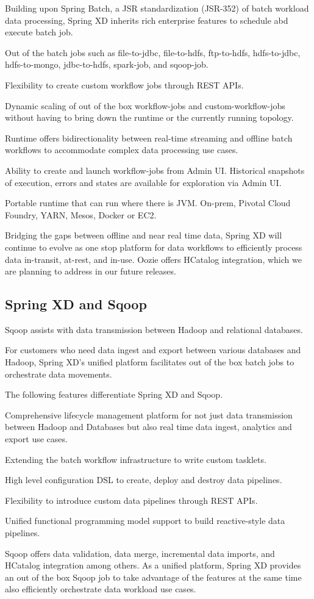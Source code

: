 \begin{itemize*}
\item Building upon Spring Batch, a JSR standardization (JSR-352) of batch workload data processing, Spring XD inherits rich enterprise features to schedule abd execute batch job.
\item Out of the batch jobs such as file-to-jdbc, file-to-hdfs, ftp-to-hdfs, hdfs-to-jdbc, hdfs-to-mongo, jdbc-to-hdfs, spark-job, and sqoop-job.
\item Flexibility to create custom workflow jobs through REST APIs.
\item Dynamic scaling of out of the box workflow-jobs and custom-workflow-jobs without having to bring down the runtime or the currently running topology.
\item Runtime offers bidirectionality between real-time streaming and offline batch workflows to accommodate complex data processing use cases.
\item Ability to create and launch workflow-jobs from Admin UI. Historical snapshots of execution, errors and states are available for exploration via Admin UI.
\item Portable runtime that can run where there is JVM. On-prem, Pivotal Cloud Foundry, YARN, Mesos, Docker or EC2.
\end{itemize*}

Bridging the gaps between offline and near real time data, Spring XD will continue to evolve as one stop platform for data workflows to efficiently process data in-transit, at-rest, and in-use. Oozie offers HCatalog integration, which we are planning to address in our future releases.

\subsection{Spring XD and Sqoop}
Sqoop\cite{sqoop} assists with data transmission between Hadoop and relational databases.

For customers who need data ingest and export between various databases and Hadoop, Spring XD's unified platform facilitates out of the box batch jobs to orchestrate data movements. 

The following features differentiate Spring XD and Sqoop.

\begin{itemize*}
\item Comprehensive lifecycle management platform for not just data transmission between Hadoop and Databases but also real time data ingest, analytics and export use cases.
\item Extending the batch workflow infrastructure to write custom tasklets.
\item High level configuration DSL to create, deploy and destroy data pipelines.
\item Flexibility to introduce custom data pipelines through REST APIs.
\item Unified functional programming model support to build reactive-style data pipelines.
\end{itemize*}

Sqoop offers data validation, data merge, incremental data imports, and HCatalog integration among others. As a unified platform, Spring XD provides an out of the box Sqoop job to take advantage of the features at the same time also efficiently orchestrate data workload use cases. 

